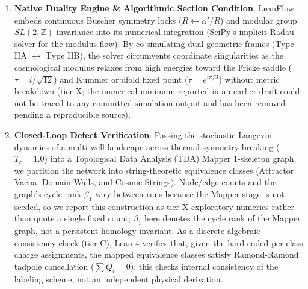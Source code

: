 \documentclass[11pt]{letter}
\begin{document}
\begin{enumerate}
    \item \textbf{Native Duality Engine \& Algorithmic Section Condition}: LeanFlow embeds continuous Buscher symmetry locks ($R \leftrightarrow \alpha'/R$) and modular group $SL(2, \mathbb{Z})$ invariance into its numerical integration (SciPy's implicit Radau solver for the modulus flow). By co-simulating dual geometric frames (Type IIA $\leftrightarrow$ Type IIB), the solver circumvents coordinate singularities as the cosmological modulus relaxes from high energies toward the Fricke saddle ($\tau = i/\sqrt{12}$) and Kummer orbifold fixed point ($\tau = e^{i\pi/3}$) without metric breakdown (tier X; the numerical minimum reported in an earlier draft could not be traced to any committed simulation output and has been removed pending a reproducible source).

    \item \textbf{Closed-Loop Defect Verification}: Passing the stochastic Langevin dynamics of a multi-well landscape across thermal symmetry breaking ($T_c = 1.0$) into a Topological Data Analysis (TDA) Mapper 1-skeleton graph, we partition the network into string-theoretic equivalence classes (Attractor Vacua, Domain Walls, and Cosmic Strings). Node/edge counts and the graph's cycle rank $\beta_1$ vary between runs because the Mapper stage is not seeded, so we report this construction as tier X exploratory numerics rather than quote a single fixed count; $\beta_1$ here denotes the cycle rank of the Mapper graph, not a persistent-homology invariant. As a discrete algebraic consistency check (tier C), Lean 4 verifies that, given the hard-coded per-class charge assignments, the mapped equivalence classes satisfy Ramond-Ramond tadpole cancellation ($\sum Q_i = 0$); this checks internal consistency of the labeling scheme, not an independent physical derivation.


\end{enumerate}
\end{document}
